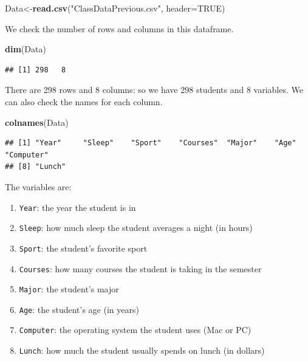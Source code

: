 \documentclass[
]{book}
\newenvironment{Shaded}{\begin{snugshade}}{\end{snugshade}}
\newcommand{\AttributeTok}[1]{\textcolor[rgb]{0.13,0.29,0.53}{#1}}
\newcommand{\ConstantTok}[1]{\textcolor[rgb]{0.56,0.35,0.01}{#1}}
\newcommand{\FunctionTok}[1]{\textcolor[rgb]{0.13,0.29,0.53}{\textbf{#1}}}
\newcommand{\NormalTok}[1]{#1}
\newcommand{\OtherTok}[1]{\textcolor[rgb]{0.56,0.35,0.01}{#1}}
\newcommand{\StringTok}[1]{\textcolor[rgb]{0.31,0.60,0.02}{#1}}
\providecommand{\tightlist}{%
  \setlength{\itemsep}{0pt}\setlength{\parskip}{0pt}}
\begin{document}
\begin{Shaded}
\begin{Highlighting}[]
\NormalTok{Data}\OtherTok{\textless{}{-}}\FunctionTok{read.csv}\NormalTok{(}\StringTok{"ClassDataPrevious.csv"}\NormalTok{, }\AttributeTok{header=}\ConstantTok{TRUE}\NormalTok{)}
\end{Highlighting}
\end{Shaded}

We check the number of rows and columns in this dataframe.

\begin{Shaded}
\begin{Highlighting}[]
\FunctionTok{dim}\NormalTok{(Data)}
\end{Highlighting}
\end{Shaded}

\begin{verbatim}
## [1] 298   8
\end{verbatim}

There are 298 rows and 8 columns: so we have 298 students and 8 variables. We can also check the names for each column.

\begin{Shaded}
\begin{Highlighting}[]
\FunctionTok{colnames}\NormalTok{(Data)}
\end{Highlighting}
\end{Shaded}

\begin{verbatim}
## [1] "Year"     "Sleep"    "Sport"    "Courses"  "Major"    "Age"      "Computer"
## [8] "Lunch"
\end{verbatim}

The variables are:

\begin{enumerate}
\def\labelenumi{\arabic{enumi}.}
\tightlist
\item
  \texttt{Year}: the year the student is in
\item
  \texttt{Sleep}: how much sleep the student averages a night (in hours)
\item
  \texttt{Sport}: the student's favorite sport
\item
  \texttt{Courses}: how many courses the student is taking in the semester
\item
  \texttt{Major}: the student's major
\item
  \texttt{Age}: the student's age (in years)
\item
  \texttt{Computer}: the operating system the student uses (Mac or PC)
\item
  \texttt{Lunch}: how much the student usually spends on lunch (in dollars)
\end{enumerate}
\end{document}
